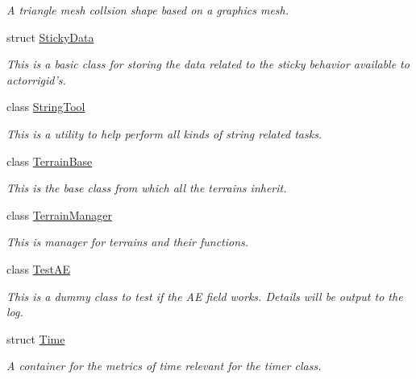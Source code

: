 \begin{DoxyCompactItemize}
\begin{DoxyCompactList}\small\item\em A triangle mesh collsion shape based on a graphics mesh. \item\end{DoxyCompactList}\item 
struct \hyperlink{structMezzanine_1_1StickyData}{StickyData}
\begin{DoxyCompactList}\small\item\em This is a basic class for storing the data related to the sticky behavior available to actorrigid's. \item\end{DoxyCompactList}\item 
class \hyperlink{classMezzanine_1_1StringTool}{StringTool}
\begin{DoxyCompactList}\small\item\em This is a utility to help perform all kinds of string related tasks. \item\end{DoxyCompactList}\item 
class \hyperlink{classMezzanine_1_1TerrainBase}{TerrainBase}
\begin{DoxyCompactList}\small\item\em This is the base class from which all the terrains inherit. \item\end{DoxyCompactList}\item 
class \hyperlink{classMezzanine_1_1TerrainManager}{TerrainManager}
\begin{DoxyCompactList}\small\item\em This is manager for terrains and their functions. \item\end{DoxyCompactList}\item 
class \hyperlink{classMezzanine_1_1TestAE}{TestAE}
\begin{DoxyCompactList}\small\item\em This is a dummy class to test if the AE field works. Details will be output to the log. \item\end{DoxyCompactList}\item 
struct \hyperlink{structMezzanine_1_1Time}{Time}
\begin{DoxyCompactList}\small\item\em A container for the metrics of time relevant for the timer class. \item\end{DoxyCompactList}\item 

\end{DoxyCompactItemize}
